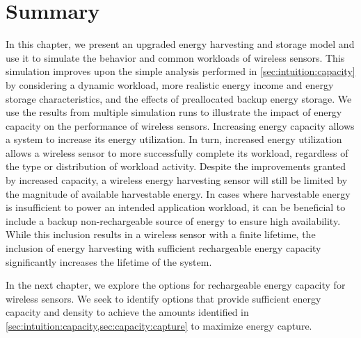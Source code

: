 \section{Summary}
In this chapter, we present an upgraded energy harvesting and storage model and use it to simulate the behavior and common workloads of wireless sensors.
This simulation improves upon the simple analysis performed in \cref{sec:intuition:capacity} by considering a dynamic workload, more realistic energy income and energy storage characteristics, and the effects of preallocated backup energy storage.
We use the results from multiple simulation runs to illustrate the impact of energy capacity on the performance of wireless sensors.
Increasing energy capacity allows a system to increase its energy utilization. In turn, increased energy utilization allows a wireless sensor to more successfully complete its workload, regardless of the type or distribution of workload activity.
Despite the improvements granted by increased capacity, a wireless energy harvesting sensor will still be limited by the magnitude of available harvestable energy.
In cases where harvestable energy is insufficient to power an intended application workload, it can be beneficial to include a backup non-rechargeable source of energy to ensure high availability.
While this inclusion results in a wireless sensor with a finite lifetime, the inclusion of energy harvesting with sufficient rechargeable energy capacity significantly increases the lifetime of the system.

In the next chapter, we explore the options for rechargeable energy capacity for wireless sensors. We seek to identify options that provide sufficient energy capacity and density to achieve the amounts identified in \cref{sec:intuition:capacity,sec:capacity:capture} to maximize energy capture.




